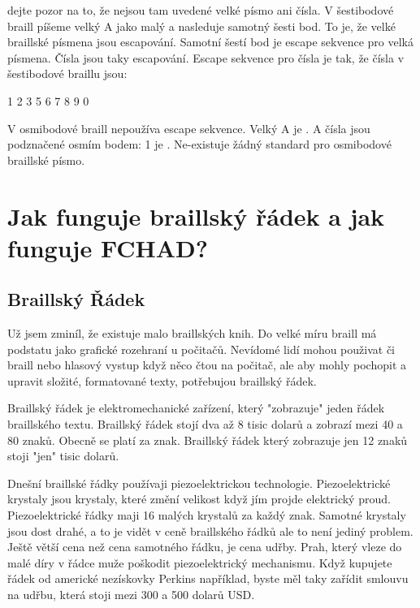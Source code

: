 dejte pozor na to, že nejsou tam uvedené velké písmo ani čísla.  V šestibodové braill píšeme velký A jako
malý a nasleduje samotný šesti bod. To je, že velké braillské písmena jsou escapování. Samotní šestí bod je escape sekvence pro velká písmena.  Čísla jsou taky escapování. Escape sekvence pro čísla je
tak, že čísla v šestibodové braillu jsou:

1
2
3
5
6
7
8
9
0

V osmibodové braill nepoužíva escape sekvence. Velký A je
. A čísla jsou podznačené osmím bodem: 1 je
. Ne-existuje žádný standard pro osmibodové braillské písmo.\citep{6dotbraille}

\section{Jak funguje braillský řádek a jak funguje FCHAD?}

\subsection{Braillský Řádek}
Už jsem zminíl, že existuje malo braillských knih. Do velké míru braill má podstatu jako grafické rozehraní u počitačů.  Nevídomé lidí mohou použivat či braill nebo hlasový vystup když něco čtou na počitač, ale aby mohly pochopit a upravit složité, formatované texty, potřebujou braillský řádek.

Braillský řádek je elektromechanické zařízení, který "zobrazuje" jeden řádek braillského textu.  Braillský řádek stojí dva až 8 tisic dolarů a zobrazí mezi 40 a 80 znaků.  Obecně se platí za znak.  Braillský řádek který zobrazuje jen 12 znaků stoji "jen" tisic dolarů\citep{perkinsdisplays}.

Dnešní braillské řádky používaji piezoelektrickou technologie.  Piezoelektrické krystaly jsou krystaly, které změní velikost když jím projde elektrický proud. Piezoelektrické řádky maji 16 malých krystalů za každý znak.  Samotné krystaly jsou dost drahé, a to je vidět v ceně braillského řádků ale to není jediný problem.  Ještě větší cena než cena samotného řádku, je cena udřby.  Prah, který vleze do malé díry v řádce muže poškodit piezoelektrický mechanismu.  Když kupujete řádek od americké nezískovky Perkins například, byste měl taky zařídit smlouvu na udřbu, která stoji mezi 300 a 500 dolarů USD\citep{perkinsdisplays}.


